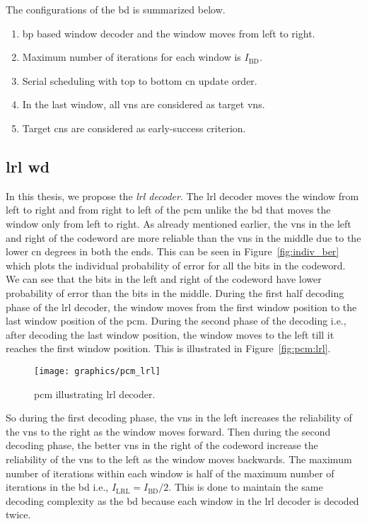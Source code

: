 The configurations of the \ac{bd} is summarized below.
\begin{enumerate}
  \item \ac{bp} based window decoder and the window moves from left to right.
  \item Maximum number of iterations for each window is $I_{\text{BD}}$.
  \item Serial scheduling with top to bottom \ac{cn} update order.
  \item In the last window, all \acp{vn} are considered as target \acp{vn}.
  \item Target \acp{cn} are considered as early-success criterion.
\end{enumerate}

\subsection{\acl{lrl} \acl{wd}}
In this thesis, we propose the \emph{\ac{lrl} decoder}. The \ac{lrl} decoder moves the window from left to right and from right to left of the \ac{pcm} unlike the \ac{bd} that moves the window only from left to right. As already mentioned earlier, the \acp{vn} in the left and right of the codeword are more reliable than the \acp{vn} in the middle due to the lower \ac{cn} degrees in both the ends. This can be seen in Figure~\ref{fig:indiv_ber} which plots the individual probability of error for all the bits in the codeword. We can see that the bits in the left and right of the codeword have lower probability of error than the bits in the middle. During the first half decoding phase of the \ac{lrl} decoder, the window moves from the first window position to the last window position of the \ac{pcm}. During the second phase of the decoding i.e., after decoding the last window position, the window moves to the left till it reaches the first window position. This is illustrated in Figure~\ref{fig:pcm:lrl}.
\begin{figure}[htbp]
  \centering
  \texttt{[image: graphics/pcm\_lrl]}
  \caption{\ac{pcm} illustrating \ac{lrl} decoder.}
  \label{fig:pcm_lrl}
\end{figure}
So during the first decoding phase, the \acp{vn} in the left increases the reliability of the \acp{vn} to the right as the window moves forward. Then during the second decoding phase, the better \acp{vn} in the right of the codeword increase the reliability of the \acp{vn} to the left as the window moves backwards. The maximum number of iterations within each window is half of the maximum number of iterations in the \ac{bd} i.e., $I_{\text{LRL}}=I_{\text{BD}}/2$. This is done to maintain the same decoding complexity as the \ac{bd} because each window in the \ac{lrl} decoder is decoded twice.

